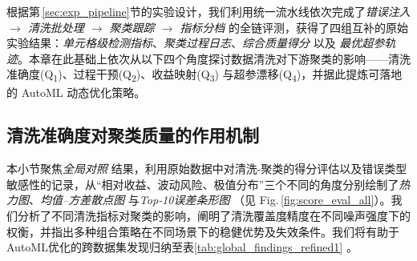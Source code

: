 \documentclass[10pt]{article} %
\numberwithin{equation}{section}
\begin{document}
\vspace{-0.3em}
\noindent

根据第\,\ref{sec:exp_pipeline}节的实验设计，我们利用统一流水线依次完成了\textit{错误注入 $\rightarrow$ 清洗批处理 $\rightarrow$ 聚类跟踪 $\rightarrow$ 指标分档} 的全链评测，获得了四组互补的原始实验结果：\emph{单元格级检测指标}、\emph{聚类过程日志}、\emph{综合质量得分} 以及 \emph{最优超参轨迹}。本章在此基础上依次从以下四个角度探讨数据清洗对下游聚类的影响——清洗准确度(Q\textsubscript{1})、过程干预(Q\textsubscript{2})、收益映射(Q\textsubscript{3}) 与超参漂移(Q\textsubscript{4})，并据此提炼可落地的 AutoML 动态优化策略。

\subsection{\textcolor[rgb]{0.00,0.07,1.00}{清洗准确度对聚类质量的作用机制}}
\label{sec:exp_results}

本小节聚焦\emph{全局对照} 结果，利用原始数据中对清洗-聚类的得分评估以及错误类型敏感性的记录，从“相对收益、波动风险、极值分布”三个不同的角度分别绘制了\emph{热力图}、\emph{均值–方差散点图} 与\emph{Top‑10误差条形图} （见 Fig.\,\ref{fig:score_eval_all}）。我们分析了不同清洗指标对聚类的影响，阐明了清洗覆盖度∕精度在不同噪声强度下的权衡，并指出多种组合策略在不同场景下的稳健优势及失效条件。我们将有助于AutoML优化的跨数据集发现归纳至表\ref{tab:global_findings_refined1} 。
\end{document}
